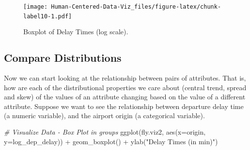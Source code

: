 \documentclass[
]{book}
\newenvironment{Shaded}{\begin{snugshade}}{\end{snugshade}}
\newcommand{\AttributeTok}[1]{\textcolor[rgb]{0.77,0.63,0.00}{#1}}
\newcommand{\CommentTok}[1]{\textcolor[rgb]{0.56,0.35,0.01}{\textit{#1}}}
\newcommand{\ConstantTok}[1]{\textcolor[rgb]{0.00,0.00,0.00}{#1}}
\newcommand{\FunctionTok}[1]{\textcolor[rgb]{0.00,0.00,0.00}{#1}}
\newcommand{\NormalTok}[1]{#1}
\newcommand{\OtherTok}[1]{\textcolor[rgb]{0.56,0.35,0.01}{#1}}
\newcommand{\SpecialCharTok}[1]{\textcolor[rgb]{0.00,0.00,0.00}{#1}}
\newcommand{\StringTok}[1]{\textcolor[rgb]{0.31,0.60,0.02}{#1}}
\begin{document}
\begin{Shaded}
\end{Shaded}

\begin{figure}
\centering
\texttt{[image: Human-Centered-Data-Viz\_files/figure-latex/chunk-label10-1.pdf]}
\caption{\label{fig:chunk-label10}Boxplot of Delay Times (log scale).}
\end{figure}

\hypertarget{compare-distributions}{%
\subsection{Compare Distributions}\label{compare-distributions}}

Now we can start looking at the relationship between pairs of attributes. That is, how are each of the distributional properties we care about (central trend, spread and skew) of the values of an attribute changing based on the value of a different attribute. Suppose we want to see the relationship between departure delay time (a numeric variable), and the airport origin (a categorical variable).

\begin{Shaded}
\begin{Highlighting}[]
\CommentTok{\# Visualize Data {-} Box Plot in groups}
\FunctionTok{ggplot}\NormalTok{(fly.viz2, }\FunctionTok{aes}\NormalTok{(}\AttributeTok{x=}\NormalTok{origin, }\AttributeTok{y=}\NormalTok{log\_dep\_delay)) }\SpecialCharTok{+} \FunctionTok{geom\_boxplot}\NormalTok{() }\SpecialCharTok{+}
  \FunctionTok{ylab}\NormalTok{(}\StringTok{"Delay Times (in min)"}\NormalTok{)}
\end{Highlighting}
\end{Shaded}
\end{document}
